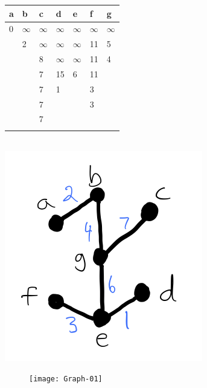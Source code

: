 \documentclass[12pt]{elsart}
\begin{document}
\hspace*{0.5cm}  \begin{tabular}{ |l|l|l|l|l|l|l| }
\hline
{\bf a} & {\bf b} & {\bf c} & {\bf d} & {\bf e} & {\bf f} & {\bf g} \\ 
  \hline
 0 & $\infty$ & $\infty$ & $\infty$ & $\infty$ & $\infty$ & $\infty$ \\
  \hline 
& 2 & $\infty$ & $\infty$ & $\infty$ & 11 & 5 \\
\hline
& & 8 & $\infty$ & $\infty$ & 11 & 4 \\
\hline
 &  & 7 & 15 & 6 & 11 &  \\
\hline
 &  & 7 & 1 &  & 3 &  \\
\hline
 &  & 7 & &  & 3 &  \\
\hline
 &  & 7 & &  &  &  \\
\hline
 &  & & &  &  &  \\
\hline
\end{tabular}\\
\includegraphics[scale=1]{prim.png}\\
\begin{figure}[h]
	\centering \texttt{[image: Graph-01]}
\end{figure}
\end{document}
